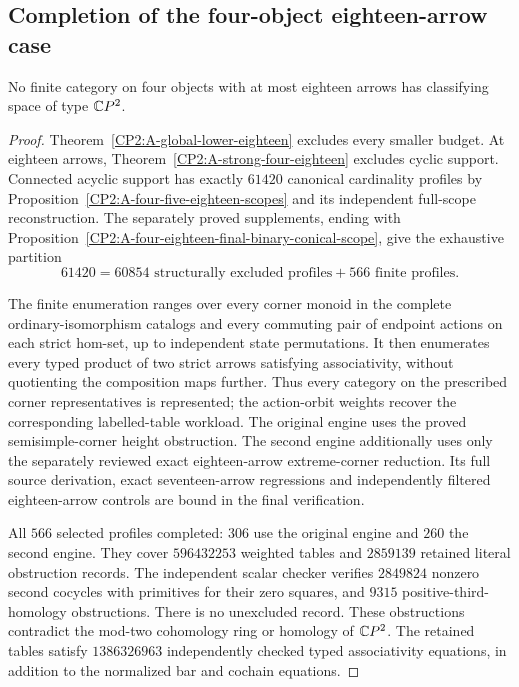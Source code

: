 \subsection{Completion of the four-object eighteen-arrow case}

\begin{theorem}
\label{CP2:A-four-eighteen-complete}
No finite category on four objects with at most eighteen
arrows has classifying space of type $\mathbb{C}P^2$.
\end{theorem}
\begin{proof}
Theorem~\ref{CP2:A-global-lower-eighteen} excludes every
smaller budget. At eighteen arrows,
Theorem~\ref{CP2:A-strong-four-eighteen} excludes cyclic
support. Connected acyclic support has exactly $61420$
canonical cardinality profiles by
Proposition~\ref{CP2:A-four-five-eighteen-scopes} and
its independent full-scope reconstruction. The separately
proved supplements, ending with
Proposition~\ref{CP2:A-four-eighteen-final-binary-conical-scope},
give the exhaustive partition
\[
61420=60854\text{ structurally excluded profiles}
       +566\text{ finite profiles}.
\]

The finite enumeration ranges over every corner monoid
in the complete ordinary-isomorphism catalogs and
every commuting pair of endpoint actions on each
strict hom-set, up to independent state permutations.
It then enumerates every typed product of two strict
arrows satisfying associativity, without quotienting
the composition maps further. Thus every category on
the prescribed corner representatives is represented;
the action-orbit weights recover the corresponding
labelled-table workload. The original engine uses
the proved semisimple-corner height obstruction. The
second engine additionally uses only the separately
reviewed exact eighteen-arrow extreme-corner reduction.
Its full source derivation, exact seventeen-arrow
regressions and independently filtered eighteen-arrow
controls are bound in the final verification.

All $566$ selected profiles completed: $306$ use the
original engine and $260$ the second engine. They cover
$596432253$ weighted tables and $2859139$ retained
literal obstruction records. The independent scalar
checker verifies $2849824$ nonzero second cocycles
with primitives for their zero squares, and $9315$
positive-third-homology obstructions. There is no
unexcluded record. These obstructions contradict
the mod-two cohomology ring or homology of $\mathbb{C}P^2$.
The retained tables satisfy $1386326963$ independently
checked typed associativity equations, in addition to
the normalized bar and cochain equations.


\end{proof}
